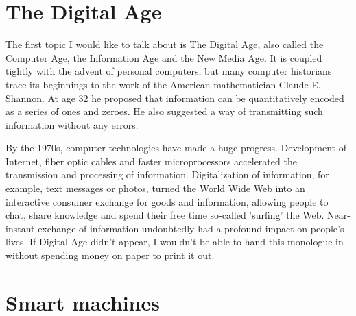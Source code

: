 \documentclass[a4paper,12pt]{article}
\begin{document}
    \section{The Digital Age}
    
    The first topic I would like to talk about is The Digital Age, also called the Computer Age, the Information Age and the New Media Age.
    It is coupled tightly with the advent of personal computers, but many computer historians
    trace its beginnings to the work of the American mathematician Claude E. Shannon. At age
    32 he proposed that information can be quantitatively encoded as a series of ones and zeroes.
    He also suggested a way of transmitting such information without any errors. 

    By the 1970s, computer technologies have made a huge progress. Development of Internet, fiber optic cables
    and faster microprocessors accelerated the transmission and processing of information. Digitalization of information,
    for example, text messages or photos, turned the World Wide Web into an interactive consumer exchange for goods and information,
    allowing people to chat, share knowledge and spend their free time so-called 'surfing' the Web. Near-instant exchange of information
    undoubtedly had a profound impact on people's lives. If Digital Age didn't appear, I wouldn't be able to hand this monologue in without
    spending money on paper to print it out.


    \section{Smart machines}
\end{document}
